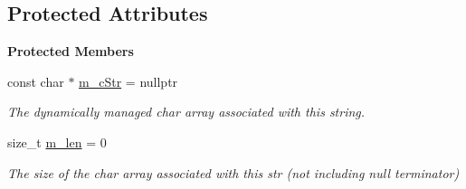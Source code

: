 \subsection*{Protected Attributes}
\begin{Indent}\textbf{ Protected Members}\par
\begin{DoxyCompactItemize}
\item 
\mbox{\label{classrev_1_1_g_string_view_a4fd3eb6a8c7aa9282d87e7935dda2ea8}} 
const char $\ast$ \mbox{\hyperlink{classrev_1_1_g_string_view_a4fd3eb6a8c7aa9282d87e7935dda2ea8}{m\+\_\+c\+Str}} = nullptr
\begin{DoxyCompactList}\small\item\em The dynamically managed char array associated with this string. \end{DoxyCompactList}\item 
\mbox{\label{classrev_1_1_g_string_view_aea396761e48755491246e31805a232dd}} 
size\+\_\+t \mbox{\hyperlink{classrev_1_1_g_string_view_aea396761e48755491246e31805a232dd}{m\+\_\+len}} = 0
\begin{DoxyCompactList}\small\item\em The size of the char array associated with this str (not including null terminator) \end{DoxyCompactList}\end{DoxyCompactItemize}
\end{Indent}
